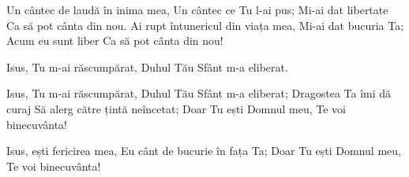 \beginverse
Un cântec de laudă în inima mea,
Un cântec ce Tu l-ai pus;
Mi-ai dat libertate
Ca să pot cânta din nou.
Ai rupt întunericul din viața mea,
Mi-ai dat bucuria Ta;
Acum eu sunt liber
Ca să pot cânta din nou!
\endverse

\beginverse
Isus, Tu m-ai răscumpărat,
Duhul Tău Sfânt m-a eliberat.
\endverse

\beginchorus
Isus, Tu m-ai răscumpărat,
Duhul Tău Sfânt m-a eliberat;
Dragostea Ta îmi dă curaj
Să alerg către țintă neîncetat;
Doar Tu ești Domnul meu,
Te voi binecuvânta!
\endchorus

\beginchorus
Isus, ești fericirea mea,
Eu cânt de bucurie în fața Ta;
Doar Tu ești Domnul meu,
Te voi binecuvânta!
\endchorus
\endsong